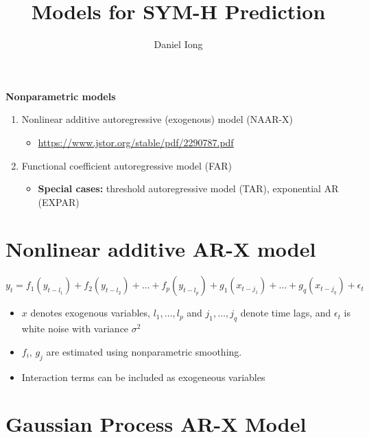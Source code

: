 \documentclass{article}
\title{Models for SYM-H Prediction}
\author{Daniel Iong}
\date{}
\begin{document}
\maketitle

\textbf{Nonparametric models}
\begin{enumerate}
    \item Nonlinear additive autoregressive (exogenous) model (NAAR-X) 
    \begin{itemize}
        \item \url{https://www.jstor.org/stable/pdf/2290787.pdf}
    \end{itemize}
    \item Functional coefficient autoregressive model (FAR)
    \begin{itemize}
        \item \textbf{Special cases:} threshold autoregressive model (TAR),
        exponential AR (EXPAR)
    \end{itemize}
\end{enumerate}

\section{Nonlinear additive AR-X model}

\begin{equation*}
    y_t = f_1 (y_{t-l_1})  + f_2(y_{t-l_2}) + \dots + f_p (y_{t-l_p}) + g_1(x_{t - j_1}) + \dots + g_q(x_{t-j_q}) + \epsilon_t
\end{equation*}

\begin{itemize}
    \item $x$ denotes exogenous variables, $l_1,\dots, l_p$ and $j_1,\dots,j_q$
    denote time lags, and $\epsilon_t$ is white noise with variance $\sigma^2$
    \item $f_i$, $g_j$ are estimated using nonparametric smoothing.
    \item Interaction terms can be included as exogeneous variables
\end{itemize}



\section{Gaussian Process AR-X Model}
\end{document}
